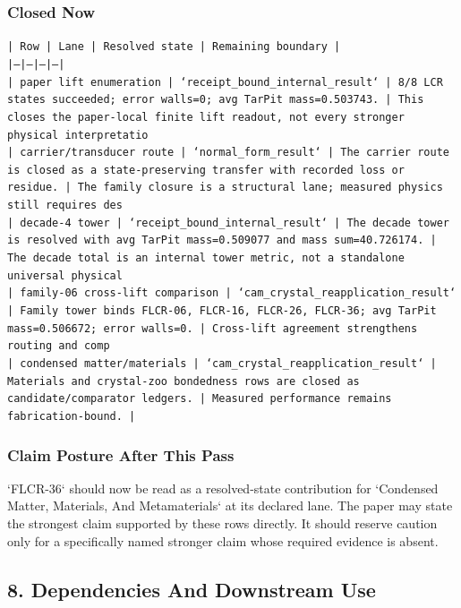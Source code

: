 \documentclass[11pt]{article}
\begin{document}
\subsubsection*{Closed Now}

\noindent\texttt{| Row | Lane | Resolved state | Remaining boundary |}\\
\noindent\texttt{|---|---|---|---|}\\
\noindent\texttt{| paper lift enumeration | `receipt\_bound\_internal\_result` | 8/8 LCR states succeeded; error walls=0; avg TarPit mass=0.503743. | This closes the paper-local finite lift readout, not every stronger physical interpretatio}\\
\noindent\texttt{| carrier/transducer route | `normal\_form\_result` | The carrier route is closed as a state-preserving transfer with recorded loss or residue. | The family closure is a structural lane; measured physics still requires des}\\
\noindent\texttt{| decade-4 tower | `receipt\_bound\_internal\_result` | The decade tower is resolved with avg TarPit mass=0.509077 and mass sum=40.726174. | The decade total is an internal tower metric, not a standalone universal physical }\\
\noindent\texttt{| family-06 cross-lift comparison | `cam\_crystal\_reapplication\_result` | Family tower binds FLCR-06, FLCR-16, FLCR-26, FLCR-36; avg TarPit mass=0.506672; error walls=0. | Cross-lift agreement strengthens routing and comp}\\
\noindent\texttt{| condensed matter/materials | `cam\_crystal\_reapplication\_result` | Materials and crystal-zoo bondedness rows are closed as candidate/comparator ledgers. | Measured performance remains fabrication-bound. |}\\

\subsubsection*{Claim Posture After This Pass}

`FLCR-36` should now be read as a resolved-state contribution for `Condensed Matter, Materials, And Metamaterials` at its declared lane. The paper may state the strongest claim supported by these rows directly. It should reserve caution only for a specifically named stronger claim whose required evidence is absent.

\subsection*{8. Dependencies And Downstream Use}
\end{document}
